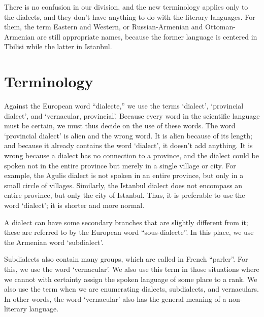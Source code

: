 There is no confusion in our division, and the new terminology applies only to the dialects, and they don't have anything to do with the literary languages. For them, the term Eastern and Western, or Russian-Armenian and Ottoman-Armenian are still appropriate names, because the former language is centered in Tbilisi while the latter in Istanbul. 


\begin{adjarianpage}\label{page:36}\end{adjarianpage}%

\section{Terminology}

Against the European word ``dialecte,''   we use the terms  `dialect',  `provincial dialect', and  `vernacular, provincial'. Because every word in the scientific language must be certain, we must thus decide on the  use of these words. The word  `provincial dialect' is alien and the wrong word. It is alien because of its length; and because it already contains the word  `dialect', it doesn't add anything. It is wrong because a dialect has no connection to a province, and the dialect could be spoken not in the entire province but merely in a single village or city. For example, the Agulis dialect is not spoken in an entire province, but only in a small circle of villages. Similarly, the Istanbul dialect does not encompass an entire province, but only the city of Istanbul. Thus, it is preferable to use the word  `dialect'; it is shorter and more normal. 

A dialect can have some secondary branches that are slightly different from it; these are referred to by the European word ``sous-dialecte''. In this place, we use the Armenian word  `subdialect'. 

Subdialects also contain many groups, which are called in French ``parler''. For this, we use the word  `vernacular'. We also use this term in those situations where we cannot with certainty assign the spoken language of some place to a rank. We also use the term when we are enumerating dialects, subdialects, and vernaculars. In other words, the word  `vernacular' also has the general meaning of a non-literary language. 


